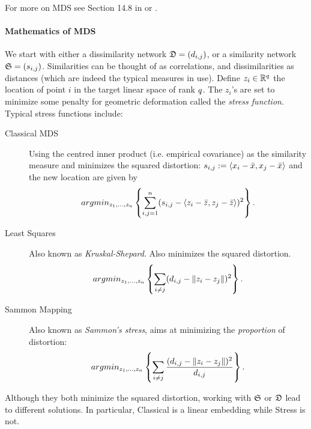 For more on MDS see Section 14.8 in \cite{hastie_elements_2003} or \cite{borg_modern_2005}.


\paragraph{Mathematics of MDS}
We start with either a dissimilarity network $\mathfrak{D}=(d_{i,j})$, or a similarity network $\mathfrak{S}=(s_{i,j})$.
Similarities can be thought of as correlations, and dissimilarities as distances (which are indeed the typical measures in use).
Define $z_i \in \mathbb{R}^q$ the location of point $i$ in the target linear space of rank $q$. 
The $z_i$'s are set to minimize some penalty for geometric deformation called the \emph{stress function}.
Typical stress functions include:
\begin{description}

\item[Classical MDS] Using the centred inner product (i.e. empirical covariance) as the similarity measure and minimizes the squared distortion:
$s_{i,j}:= \left< x_i-\bar x,x_j-\bar{x} \right>$ and the new location are given by
\begin{align}
\label{eq:mds_classical}
	 argmin_{z_1,\dots,z_n}\left\{ \sum_{i,j=1}^{n} (s_{i,j}-\left< z_i-\bar z,z_j-\bar{z} \right> )^2 \right\}.
\end{align}

\item[Least Squares] Also known as \emph{Kruskal-Shepard}. Also minimizes the squared distortion. 
\begin{align}
\label{eq:mds_stress}
	 argmin_{z_1,\dots,z_n}\left\{ \sum_{i \neq j} (d_{i,j}-\Vert z_i-z_j \Vert )^2 \right\}.
\end{align}

\item[Sammon Mapping] Also known as \emph{Sammon's stress}, aims at minimizing the \emph{proportion} of distortion:
\begin{align}
\label{eq:mds_sammon}
	 argmin_{z_1,\dots,z_n}\left\{ \sum_{i \neq j} \frac{(d_{i,j}-\Vert z_i-z_j \Vert )^2}{d_{i,j}} \right\}.
\end{align}

\end{description}


\begin{remark}
Although they both minimize the squared distortion, working with $\mathfrak{S}$ or $\mathfrak{D}$ lead to different solutions. 
In particular, Classical is a linear embedding while Stress is not. 
\end{remark}




